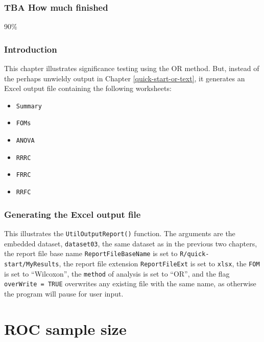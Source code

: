 \documentclass[
]{book}
\providecommand{\tightlist}{%
  \setlength{\itemsep}{0pt}\setlength{\parskip}{0pt}}
\begin{document}
\hypertarget{quick-start-or-excel-how-much-finished}{%
\section{TBA How much finished}\label{quick-start-or-excel-how-much-finished}}

90\%

\hypertarget{quick-start-or-excel-intro}{%
\section{Introduction}\label{quick-start-or-excel-intro}}

This chapter illustrates significance testing using the OR method. But, instead of the perhaps unwieldy output in Chapter \ref{quick-start-or-text}, it generates an Excel output file containing the following worksheets:

\begin{itemize}
\tightlist
\item
  \texttt{Summary}
\item
  \texttt{FOMs}
\item
  \texttt{ANOVA}
\item
  \texttt{RRRC}
\item
  \texttt{FRRC}
\item
  \texttt{RRFC}
\end{itemize}

\hypertarget{quick-start-or-excel-output}{%
\section{Generating the Excel output file}\label{quick-start-or-excel-output}}

This illustrates the \texttt{UtilOutputReport()} function. The arguments are the embedded dataset, \texttt{dataset03}, the same dataset as in the previous two chapters, the report file base name \texttt{ReportFileBaseName} is set to \texttt{R/quick-start/MyResults}, the report file extension \texttt{ReportFileExt} is set to \texttt{xlsx}, the \texttt{FOM} is set to ``Wilcoxon'', the \texttt{method} of analysis is set to ``OR'', and the flag \texttt{overWrite\ =\ TRUE} overwrites any existing file with the same name, as otherwise the program will pause for user input.

\hypertarget{part-roc-sample-size}{%
\part*{ROC sample size}\label{part-roc-sample-size}}
\end{document}
